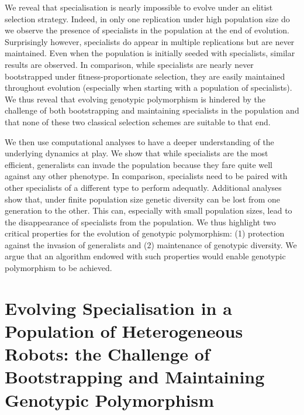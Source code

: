 We reveal that specialisation is nearly impossible to evolve under an elitist selection strategy. Indeed, in only one replication under high population size do we observe the presence of specialists in the population at the end of evolution. Surprisingly however, specialists do appear in multiple replications but are never maintained. Even when the population is initially seeded with specialists, similar results are observed. In comparison, while specialists are nearly never bootstrapped under fitness-proportionate selection, they are easily maintained throughout evolution (especially when starting with a population of specialists). We thus reveal that evolving genotypic polymorphism is hindered by the challenge of both bootstrapping and maintaining specialists in the population and that none of these two classical selection schemes are suitable to that end.

We then use computational analyses to have a deeper understanding of the underlying dynamics at play. We show that while specialists are the most efficient, generalists can invade the population because they fare quite well against any other phenotype. In comparison, specialists need to be paired with other specialists of a different type to perform adequatly. Additional analyses show that, under finite population size genetic diversity can be lost from one generation to the other. This can, especially with small population sizes, lead to the disappearance of specialists from the population. We thus highlight two critical properties for the evolution of genotypic polymorphism: (1) protection against the invasion of generalists and (2) maintenance of genotypic diversity. We argue that an algorithm endowed with such properties would enable genotypic polymorphism to be achieved.

\clearpage

\chapter{Evolving Specialisation in a Population of Heterogeneous Robots: the Challenge of Bootstrapping and Maintaining Genotypic Polymorphism}


